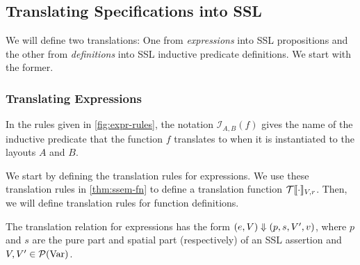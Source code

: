 
\subsection{Translating \tool Specifications into SSL}

We will define two translations: One from \tool \textit{expressions} into SSL propositions and the other from
\tool \textit{definitions} into SSL inductive predicate definitions. We start with the former.

\subsubsection{Translating Expressions}

In the rules given in \autoref{fig:expr-rules}, the notation $\mathcal{I}_{A,B}(f)$ gives the name of the inductive predicate that the \tool
function $f$ translates to when it is instantiated to the layouts $A$ and $B$.

We start by defining the translation rules for expressions. We use these translation rules in \autoref{thm:ssem-fn} to
define a translation function $\mathcal{T}\llbracket\cdot\rrbracket_{V,r}$. Then, we will define translation rules for function definitions.

The translation relation for expressions has the form $(e, V) \Downarrow (p, s, V', v)$,
where $p$ and $s$ are the pure part and spatial part (respectively) of an SSL assertion and $V,V' \in \mathcal{P}(\textnormal{Var})$.

